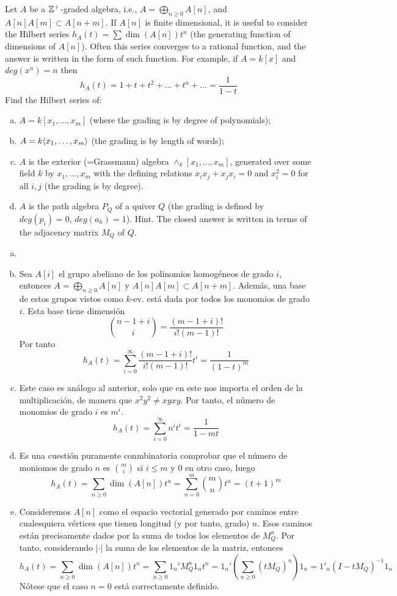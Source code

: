 \documentclass[twoside]{article}
\begin{document}
\newpage
\begin{ejercicio}{1.34}
Let $A$ be a $\mathbb{Z}^+$-graded algebra, i.e., $A = \bigoplus_{n≥0}A[n]$, and $A[n]A[m] ⊂ A[n + m]$. If $A[n]$ is finite dimensional, it is useful to consider the Hilbert series $h_A(t) = \sum \dim(A[n])t^n$ (the generating function of dimensions of $A[n]$). Often this series converges to a rational function, and the answer is written in the form of such function. For example, if $A = k[x]$ and $deg(x^n) = n$ then
$$
h_A(t) = 1 + t + t^2 + \dotsc  + t^n + \dotsc  = \frac{1}{1-t}
$$
Find the Hilbert series of:
\begin{enumerate}[a)]
\item $A = k[x_1,\dotsc, x_m]$ (where the grading is by degree of polynomials);
\item $A = k \langle{ x_1, \dotsc , x_m}\rangle$ (the grading is by length of words);
\item $A$ is the exterior (=Grassmann) algebra $∧_k[x_1, \dotsc , x_m]$, generated over some field $k$ by $x_1, \dotsc , x_m$ with the defining relations $x_ix_j + x_jx_i = 0$ and $x^2_i = 0$ for all $i, j$ (the grading is by degree).
\item $A$ is the path algebra $P_Q$	of a quiver $Q$ (the grading is defined by $deg(p_i) = 0$, $deg(a_h) = 1$).
Hint. The closed answer is written in terms of the adjacency matrix $M_Q$ of $Q$.
\end{enumerate}
\end{ejercicio}
\begin{solucion}
\begin{enumerate}[a)]
\item[]
\item Sea $A[i]$ el grupo abeliano de los polinomios homogéneos de grado $i$, entonces $A= \bigoplus_{n\geq 0}A[n]$ y $A[n]A[m]\subset A[n+m]$. Además, una base de estos grupos vistos como $k$-ev. está dada por todos los monomios de grado $i$. Esta base tiene dimensión
$$
\binom{n-1+i}{i} = \frac{(m-1+i)!}{i!(m-1)!}
$$
Por tanto
$$
h_A(t) = \sum_{i=0}^\infty \frac{(m-1+i)!}{i!(m-1)!} t^i = \frac{1}{(1-t)^m}
$$
\item Este caso es análogo al anterior, solo que en este nos importa el orden de la multiplicación, de manera que $x^2y^2 \neq xyxy$. Por tanto, el número de monomios de grado $i$ es $m^i$. 
$$
h_A(t) = \sum_{i=0}^\infty n^i t^i = \frac{1}{1-mt} 
$$
\item Es una cuestión puramente conmbinatoria comprobar que el número de moniomos de grado $n$ es $\binom{m}{i}$ si $i\leq m$ y $0$ en otro caso, luego
$$
h_A(t) = \sum_{n\geq 0} \dim(A[n])t^n = \sum_{n=0}^m \binom{m}{n}t^n = (t+1)^m
$$
\item Consideremos $A[n]$ como el espacio vectorial generado por caminos entre cualesquiera vértices que tienen longitud (y por tanto, grado) $n$. Esos caminos están precisamente dados por la suma de todos los elementos de $M_Q^n$. Por tanto, considerando $|\cdot|$ la suma de los elementos de la matriz, entonces
$$
h_A(t) = \sum_{n\geq 0} \dim(A[n])t^n =  \sum_{n\geq 0}1_n'M_Q^n1_nt^n = 1_n' \left(\sum_{n\geq 0} (tM_Q)^n \right)1_n = 1'_n (I-tM_Q)^{-1}1_n
$$
Nótese que el caso $n=0$ está correctamente definido.
\end{enumerate}
\end{solucion}
\end{document}
